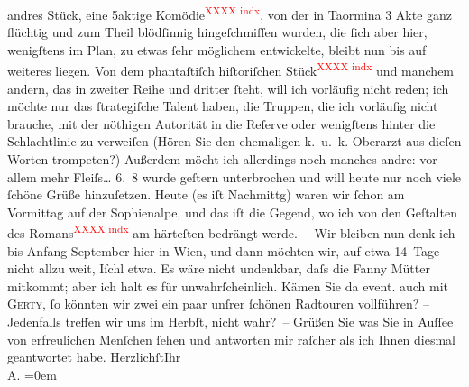 \begin{ledgroupsized}[t]{13cm}
               andres Stück, eine 5aktige
                  Komödie\textcolor{red}{\textsuperscript{XXXX indx}}, von der in Taormina 3 Akte ganz
               flüchtig und zum Theil blödſinnig hingeſchmiſſen wurden, die ſich aber hier,
               wenigſtens im Plan, zu etwas ſehr möglichem entwickelte, {\pb}bleibt nun bis auf weiteres liegen. Von dem phantaſtiſch hiſtoriſchen Stück\textcolor{red}{\textsuperscript{XXXX indx}} und manchem andern, das in
               zweiter Reihe und dritter ſteht, will ich vorläufig nicht reden; ich möchte nur das
               ſtrategiſche Talent haben, die Truppen, die ich vorläufig nicht brauche, mit der
               nöthigen Autorität in die Reſerve oder wenigſtens hinter die Schlachtlinie zu
               verweiſen (Hören Sie den ehemaligen k. u. k. Oberarzt aus dieſen Worten trompeten?)
               Außerdem {\pb}möcht ich allerdings noch manches andre: vor
               allem mehr Fleiſs{\dots}\pend
           \pstart
           \raggedleft{}6. 8\pend
           \pstart
           wurde geſtern unterbrochen und will heute nur noch viele ſchöne Grüße hinzuſetzen.
               Heute (es iſt Nachmittg) waren wir ſchon am Vormittag auf
               der Sophienalpe, und das iſt die Gegend, wo ich von
               den Geſtalten des Romans\textcolor{red}{\textsuperscript{XXXX indx}} am
               härteſten bedrängt werde. –\pend
           \pstart
           Wir bleiben nun denk ich bis Anfang September hier in Wien, und dann möchten wir, auf etwa 14 Tage nicht allzu weit,
                  Iſchl etwa. Es {\pb}wäre
               nicht undenkbar, daſs die Fanny Mütter mitkommt;
               aber ich halt es für unwahrſcheinlich. Kämen Sie da{\geminationn}
               event. auch mit \textsc{Gerty}, ſo könnten wir zwei ein paar unſrer ſchönen Radtouren vollführen? – Jedenfalls
               treffen wir uns im Herbſt, nicht wahr? –\pend
           \pstart
           Grüßen Sie was Sie in Auſſee von erfreulichen
               Menſchen ſehen und antworten mir raſcher als ich Ihnen diesmal geantwortet habe.\pend
           \pstart
           Herzlichſt\hspace*{1.5em}Ihr{\\[\baselineskip]}\spacefill\mbox{A.}\pend
           \leftskip=0em{}
         
         \endnumbering{}\end{ledgroupsized}  \newcommand{\dateiname}{L01422}\newcommand{\titel}{Arthur Schnitzler an Hugo von Hofmannsthal, 5.–6. 8. 1904}\newcommand{\editorInnen}{Martin Anton Müller und Gerd-Hermann Susen}
      